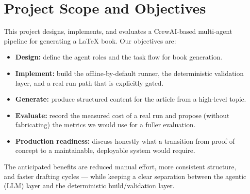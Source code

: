 \section{Project Scope and Objectives}

This project designs, implements, and evaluates a CrewAI-based multi-agent
pipeline for generating a \LaTeX{} book. Our objectives are:

\begin{itemize}
  \item \textbf{Design:} define the agent roles and the task flow for book
        generation.
  \item \textbf{Implement:} build the offline-by-default runner, the
        deterministic validation layer, and a real run path that is
        explicitly gated.
  \item \textbf{Generate:} produce structured content for the article from a
        high-level topic.
  \item \textbf{Evaluate:} record the measured cost of a real run and propose
        (without fabricating) the metrics we would use for a fuller
        evaluation.
  \item \textbf{Production readiness:} discuss honestly what a transition
        from proof-of-concept to a maintainable, deployable system would
        require.
\end{itemize}

The anticipated benefits are reduced manual effort, more consistent
structure, and faster drafting cycles --- while keeping a clear separation
between the agentic (LLM) layer and the deterministic build/validation
layer.

